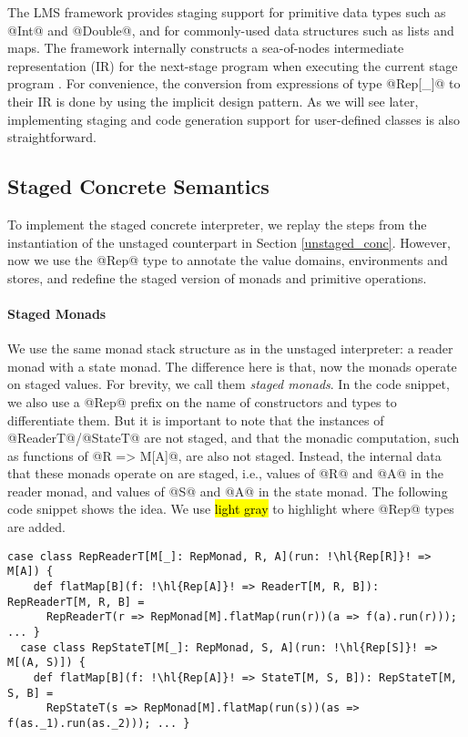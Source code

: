 The LMS framework provides staging support for primitive data types such as
@Int@ and @Double@, and for commonly-used data structures such as lists and
maps.  The framework internally constructs a sea-of-nodes intermediate
representation (IR) for the next-stage program when executing the current stage
program \cite{DBLP:conf/birthday/Rompf16}.
For convenience, the conversion from expressions of type @Rep[_]@ to their IR
is done by using the implicit design pattern. As we will see later,
implementing staging and code generation support for user-defined classes is
also straightforward.

\subsection{Staged Concrete Semantics}

To implement the staged concrete interpreter, we replay the steps from the
instantiation of the unstaged counterpart in Section \ref{unstaged_conc}.
However, now we use the @Rep@ type to annotate the value domains, environments and
stores, and redefine the staged version of monads and primitive operations.

\paragraph{Staged Monads}
We use the same monad stack structure as in the unstaged interpreter: a reader
monad with a state monad. The difference here is that, now the monads operate
on staged values.  For brevity, we call them \textit{staged monads}. In the
code snippet, we also use a @Rep@ prefix on the name of constructors and types
to differentiate them.
But it is important to note that the instances of @ReaderT@/@StateT@ are not
staged, and that the monadic computation, such as functions of @R => M[A]@, are
also not staged. Instead, the internal data that these monads operate on are
staged, i.e., values of @R@ and @A@ in the reader monad, and values of @S@ and
@A@ in the state monad.
The following code snippet shows the idea. We use \hl{light gray} to highlight
where @Rep@ types are added.
\begin{lstlisting}[escapechar=!]
  case class RepReaderT[M[_]: RepMonad, R, A](run: !\hl{Rep[R]}! => M[A]) {
    def flatMap[B](f: !\hl{Rep[A]}! => ReaderT[M, R, B]): RepReaderT[M, R, B] =
      RepReaderT(r => RepMonad[M].flatMap(run(r))(a => f(a).run(r))); ... }
  case class RepStateT[M[_]: RepMonad, S, A](run: !\hl{Rep[S]}! => M[(A, S)]) {
    def flatMap[B](f: !\hl{Rep[A]}! => StateT[M, S, B]): RepStateT[M, S, B] =
      RepStateT(s => RepMonad[M].flatMap(run(s))(as => f(as._1).run(as._2))); ... }
\end{lstlisting}

